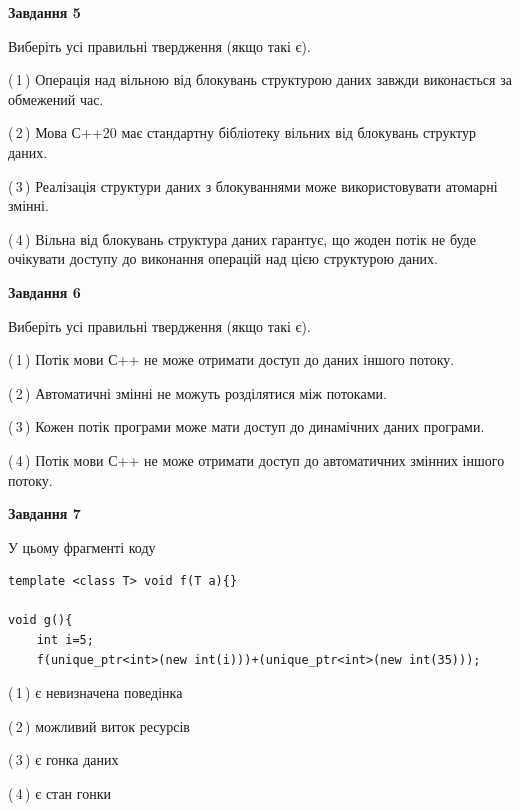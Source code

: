 \documentclass[12pt, ukrainian]{article}
\begin{document}
\begin {large}
{\begin{center}
\textbf{Завдання 5}
\end{center}

Виберіть усі правильні твердження (якщо такі є).\par
\vspace{2mm}

(\,1\,) Операція над вільною від блокувань структурою даних завжди виконається за обмежений час.%

(\,2\,) Мова С++20 має стандартну бібліотеку вільних від блокувань структур даних.%

(\,3\,) Реалізація структури даних з блокуваннями може використовувати атомарні змінні.%

(\,4\,) Вільна від блокувань структура даних гарантує, що жоден потік не буде очікувати доступу до виконання операцій над цією структурою даних.%
\newpage


\begin{center}
\textbf{Завдання 6}
\end{center}

Виберіть усі правильні твердження (якщо такі є).\par
\vspace{2mm}

(\,1\,) Потік мови С++ не може отримати доступ до даних іншого потоку.%

(\,2\,) Автоматичні змінні не можуть розділятися між потоками.%

(\,3\,) Кожен потік програми може мати доступ до динамічних даних програми.%

(\,4\,) Потік мови С++ не може отримати доступ до автоматичних змінних іншого потоку.%


\begin{center}
\textbf{Завдання 7}
\end{center}

У цьому фрагменті коду
\begin{verbatim}
template <class T> void f(T a){}

void g(){
    int i=5;
    f(unique_ptr<int>(new int(i)))+(unique_ptr<int>(new int(35)));
\end{verbatim}
(\,1\,) є невизначена поведінка%

(\,2\,) можливий виток ресурсів%

(\,3\,) є гонка даних%

(\,4\,) є стан гонки%

}
\end {large}

\vspace{4mm}
\newpage
\end{document}
